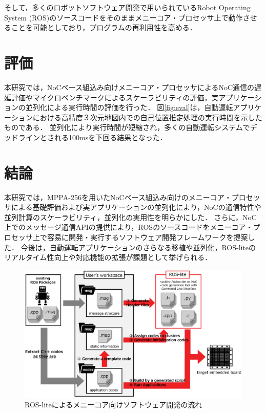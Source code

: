 \documentclass[a4j,10pt,twocolumn]{abstract}
\begin{document}
そして，多くのロボットソフトウェア開発で用いられているRobot Operating System (ROS)のソースコードをそのままメニーコア・プロセッサ上で動作させることを可能としており，プログラムの再利用性を高める．

\section{評価}
本研究では，NoCベース組込み向けメニーコア・プロセッサによるNoC通信の遅延評価やマイクロベンチマークによるスケーラビリティの評価，実アプリケーションの並列化による実行時間の評価を行った．
図\ref{fig:eval}は，自動運転アプリケーションにおける高精度３次元地図内での自己位置推定処理の実行時間を示したものである．
並列化により実行時間が短縮され，多くの自動運転システムでデッドラインとされる100msを下回る結果となった．

\section{結論}
本研究では，MPPA-256を用いたNoCベース組込み向けのメニーコア・プロセッサによる基礎評価および実アプリケーションの並列化により，NoCの通信特性や並列計算のスケーラビリティ，並列化の実用性を明らかにした．
さらに，NoC上でのメッセージ通信APIの提供により，ROSのソースコードをメニーコア・プロセッサ上で容易に開発・実行するソフトウェア開発フレームワークを提案した．
今後は，自動運転アプリケーションのさらなる移植や並列化，ROS-liteのリアルタイム性向上や対応機能の拡張が課題として挙げられる．

\begin{figure}[t]
    \centering
    \includegraphics[width=0.9\linewidth]{../../figure/roslite/system_model.eps}
    \caption{\label{fig:model}
        ROS-liteによるメニーコア向けソフトウェア開発の流れ}
\end{figure}
\end{document}
